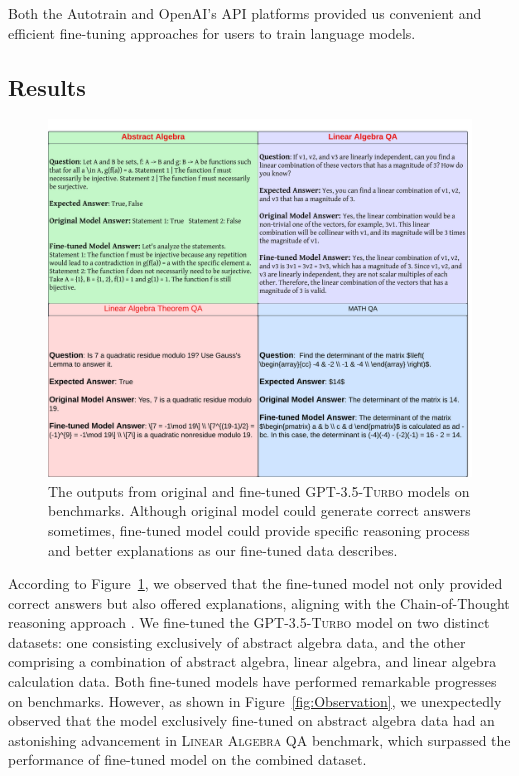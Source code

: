 \documentclass[10pt]{article}
\begin{document}
  Both the Autotrain and OpenAI's API platforms provided us convenient and efficient fine-tuning approaches for users to train language models.
\subsection{Results}
\begin{figure}[h]
    \centering
    \includegraphics[width=0.6\linewidth]{Figures/Model Outputs.png}
    \caption{The outputs from original and fine-tuned \textsc{GPT-3.5-Turbo} models on benchmarks. Although original model could generate correct answers sometimes, fine-tuned model could provide specific reasoning process and better explanations as our fine-tuned data describes.}
    \label{fig:Outputs}
\end{figure}
 
According to Figure~\ref{fig:Outputs}, we observed that the fine-tuned model not only provided correct answers but also offered explanations, aligning with the Chain-of-Thought reasoning approach \cite{wei2023chainofthoughtpromptingelicitsreasoning}. We fine-tuned the \textsc{GPT-3.5-Turbo} model on two distinct datasets: one consisting exclusively of abstract algebra data, and the other comprising a combination of abstract algebra, linear algebra, and linear algebra calculation data. Both fine-tuned models have performed remarkable progresses on benchmarks. However, as shown in Figure~\ref{fig:Observation}, we unexpectedly observed that the model exclusively fine-tuned on abstract algebra data had an astonishing advancement in \textsc{Linear Algebra QA} benchmark, which surpassed the performance of fine-tuned model on the combined dataset. 
\end{document}
